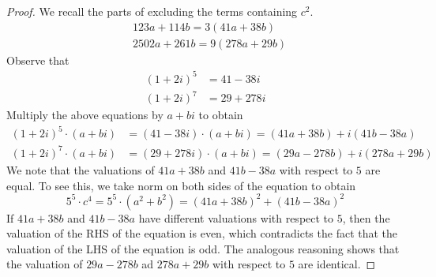 \documentclass[12pt]{amsart}
\numberwithin{equation}{section} %
\theoremstyle{definition} \newtheorem{definition}[counter]{Definition}
\theoremstyle{remark} \newtheorem{nonexam}[counter]{Non-example}
\begin{document}
\begin{proof}
    We recall the parts of  excluding the terms containing $c^2$.
    \begin{align*}
        &123a + 114b = 3(41a + 38b) \\
        &2502a + 261b = 9(278a + 29b)
    \end{align*}
    Observe that
    \begin{align*}
        (1+2i)^5 &= 41 - 38i\\
        (1+2i)^7 &= 29 + 278i
    \end{align*}
    Multiply the above equations by $a+bi$ to obtain
    \begin{align*}
        (1+2i)^5 \cdot (a+bi) &= (41-38i) \cdot (a+bi) = (41a + 38b) + i(41b - 38a) \\
        (1+2i)^7 \cdot (a+bi) &= (29+278i) \cdot (a+bi) = (29a -278b) + i(278a + 29b)
    \end{align*}
    We note that the valuations of $41a + 38b$ and $41b-38a$ with respect to $5$ are equal. To see this, we take norm on both sides of the equation to obtain
    \begin{equation*}
        5^5 \cdot c^4 = 5^5 \cdot (a^2 + b^2) = (41a + 38b)^2 + (41b-38a)^2
    \end{equation*}
    If $41a + 38b$ and $41b-38a$ have different valuations with respect to $5$, then the valuation of the RHS of the equation is even, which contradicts the fact that the valuation of the LHS of the equation is odd. The analogous reasoning shows that the valuation of $29a - 278b$ ad $278a + 29b$ with respect to $5$ are identical.
    

\end{proof}
\end{document}
